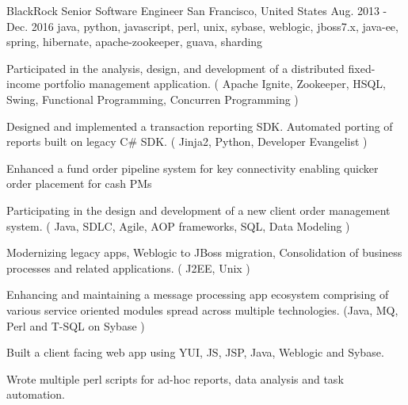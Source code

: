 \cventry
    {BlackRock} %
    {Senior Software Engineer} %
    {San Francisco, United States} %
    {Aug. 2013 - Dec. 2016} %
    {java, python, javascript, perl, unix, sybase, weblogic, jboss7.x, java-ee, spring, hibernate, apache-zookeeper, guava, sharding}%
    {
    \begin{cvitems} %
        \item { Participated in the analysis, design, and development of a distributed fixed-income portfolio management application. ( Apache Ignite, Zookeeper, HSQL, Swing, Functional Programming, Concurren Programming )}
        \item { Designed and implemented a transaction reporting SDK. Automated porting of reports built on legacy C\# SDK. ( Jinja2, Python, Developer Evangelist )}
        \item { Enhanced a fund order pipeline system for key connectivity enabling quicker order placement for cash PMs}
        \item { Participating in the design and development of a new client order management system. ( Java, SDLC, Agile, AOP frameworks, SQL, Data Modeling )}
        \item { Modernizing legacy apps, Weblogic to JBoss migration, Consolidation of business processes and related applications. ( J2EE, Unix )}
        \item { Enhancing and maintaining a message processing app ecosystem comprising of various service oriented modules spread across multiple technologies. (Java, MQ, Perl and T-SQL on Sybase )}
        \item { Built a client facing web app using YUI, JS, JSP, Java, Weblogic and Sybase.}
        \item { Wrote multiple perl scripts for ad-hoc reports, data analysis and task automation.}
    \end{cvitems}
    }